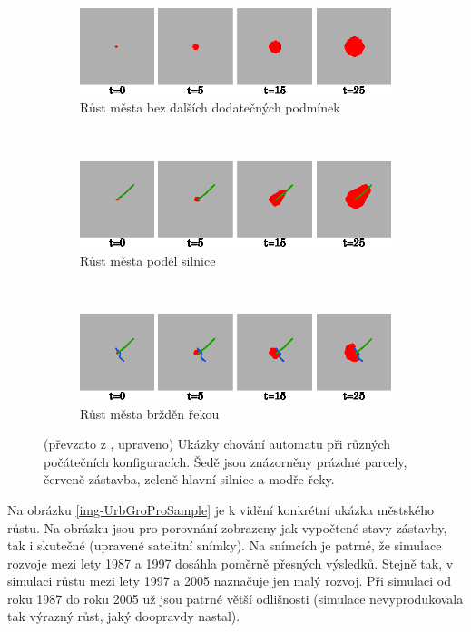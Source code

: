\documentclass[a4paper,10pt]{article}
\begin{document}
\begin{figure}[]
    \begin{subfigure}[t]{\textwidth} \centering
      \includegraphics[width=\textwidth]{urban-growt-transitions-1}
      \caption{Růst města bez dalších dodatečných podmínek} 
    \end{subfigure}
    \\
    \begin{subfigure}[t]{\textwidth} \centering
      \includegraphics[width=\textwidth]{urban-growt-transitions-2}
      \caption{Růst města podél silnice} 
    \end{subfigure}
    \\
    \begin{subfigure}[t]{\textwidth} \centering
      \includegraphics[width=\textwidth]{urban-growt-transitions-3}
      \caption{Růst města bržděn řekou} 
    \end{subfigure}

    \caption[Ukázky chování automatu]{(převzato z \cite{LiuPhi-DevCelAutModUrbGroIncFuzSetApp}, upraveno) Ukázky chování automatu při různých počátečních konfiguracích. Šedě jsou znázorněny prázdné parcely, červeně zástavba, zeleně hlavní silnice a modře řeky.} \label{img-VarTransRuls}
\end{figure}

Na obrázku \ref{img-UrbGroProSample} je k vidění konkrétní ukázka městského růstu. Na obrázku jsou pro porovnání zobrazeny jak vypočtené stavy zástavby, tak i skutečné (upravené satelitní snímky). Na snímcích je patrné, že simulace rozvoje mezi lety 1987 a 1997 dosáhla poměrně přesných výsledků. Stejně tak, v simulaci růstu mezi lety 1997 a 2005 naznačuje jen malý rozvoj. Při simulaci od roku 1987 do roku 2005 už jsou patrné větší odlišnosti (simulace nevyprodukovala tak výrazný růst, jaký doopravdy nastal).
\end{document}
